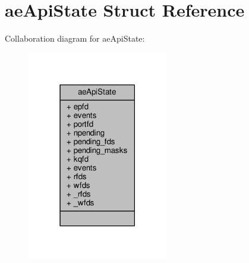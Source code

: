 \hypertarget{structaeApiState}{}\section{ae\+Api\+State Struct Reference}
\label{structaeApiState}


Collaboration diagram for ae\+Api\+State\+:\nopagebreak
\begin{figure}[H]
\begin{center}
\leavevmode
\includegraphics[width=174pt]{structaeApiState__coll__graph}
\end{center}
\end{figure}
